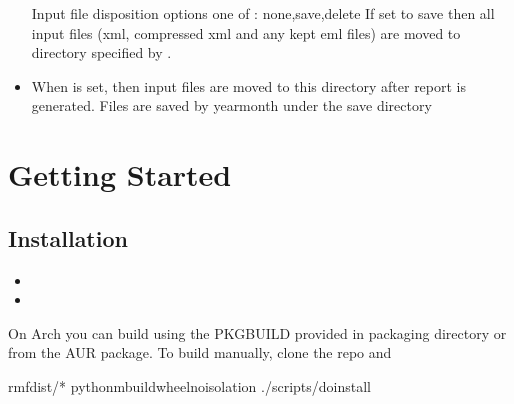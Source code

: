 \documentclass[letterpaper,10pt,english]{sphinxmanual}
\begin{document}
\begin{itemize}
\sphinxAtStartPar
Input file disposition options one of : none,save,delete
If set to save then all input files (xml, compressed xml and any kept eml files) are moved
to directory specified by .

\item {} 
\sphinxAtStartPar
{}

\sphinxAtStartPar
When  is set, then input files are moved to this directory after report
is generated.  Files are saved by year\sphinxhyphen{}month under the save directory

\end{itemize}


\chapter{Getting Started}
\label{\detokenize{README:getting-started}}

\section{Installation}
\label{\detokenize{README:installation}}\begin{description}
\begin{itemize}
\item {} 
\sphinxAtStartPar
{}

\item {} 
\sphinxAtStartPar
{}

\end{itemize}

\end{description}

\sphinxAtStartPar
On Arch you can build using the PKGBUILD provided in packaging directory or from the AUR package.
To build manually, clone the repo and

\begin{sphinxVerbatim}[commandchars=\\\{\}]
rm\PYGZhy{}fdist/*
python\PYGZhy{}mbuild\PYGZhy{}\PYGZhy{}wheel\PYGZhy{}\PYGZhy{}no\PYGZhy{}isolation
./scripts/do\PYGZhy{}install
\end{sphinxVerbatim}
\end{document}
